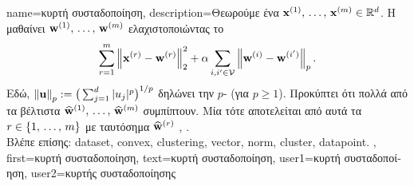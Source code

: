 {name={\foreignlanguage{greek}{κυρτή συσταδοποίηση}}, 
 	description={\foreignlanguage{greek}{Θεωρούμε ένα} 
		 ${\bf x}^{(1)}, \,\ldots, \,{\bf x}^{(m)} \in \mathbb{R}^{d}$. 
 		\foreignlanguage{greek}{Η}   \foreignlanguage{greek}{μαθαίνει}  
		${\bf w}^{(1)}, \,\ldots, \,{\bf w}^{(m)}$ \foreignlanguage{greek}{ελαχιστοποιώντας το} 
 		$$\sum_{r=1}^{m} \left\Vert {{\bf x}^{(r)} - {\bf w}^{(r)}} \right\Vert_{2}^2 + 
 		\alpha \sum_{i,i' \in \mathcal{V}} \left\Vert {{\bf w}^{(i)} - {\bf w}^{(i')}} \right\Vert_{p}.$$ 
		\foreignlanguage{greek}{Εδώ,} $\left\Vert {{\bf u}} \right\Vert_{p} := \big( \sum_{j=1}^{d} |u_{j}|^{p} \big)^{1/p}$ 
		\foreignlanguage{greek}{δηλώνει την} $p$- (\foreignlanguage{greek}{για} $p\geq1$).  
		\foreignlanguage{greek}{Προκύπτει ότι πολλά από τα βέλτιστα}  
		$\widehat{{\bf w}}^{(1)}, \,\ldots, \,\widehat{{\bf w}}^{(m)}$ 
		\foreignlanguage{greek}{συμπίπτουν. Μία}  \foreignlanguage{greek}{τότε αποτελείται από αυτά τα} 
		\linebreak $r \in \{1, \,\ldots, \,m\}$ 
		\foreignlanguage{greek}{με ταυτόσημα} $\widehat{{\bf w}}^{(r)}$ \cite{JMLR:v22:18-694}, \cite{Pelckmans2005}.\\
		\foreignlanguage{greek}{Βλέπε επίσης:} \gls{dataset}, \gls{convex}, \gls{clustering}, \gls{vector}, \gls{norm}, \gls{cluster}, \gls{datapoint}. },
 	first={\foreignlanguage{greek}{κυρτή συσταδοποίηση}},
	text={\foreignlanguage{greek}{κυρτή συσταδοποίηση}},
	user1={\foreignlanguage{greek}{κυρτή συσταδοποίηση}}, %
	user2={\foreignlanguage{greek}{κυρτής συσταδοποίησης}} %
}

